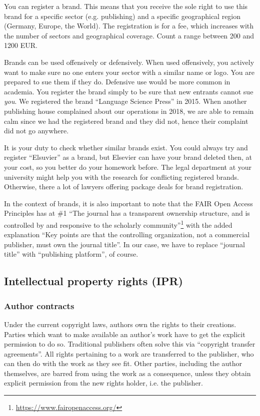 \documentclass[nonflat,smallfont
]{langsci/langscibook}
\newcommand{\footurl}[1]{\footnote{\url{#1}}}
\begin{document}
You can register a brand. This means that you receive the sole right to use this brand for a specific sector (e.g. publishing) and a specific geographical region (Germany, Europe, the World). The registration is for a fee, which increases with the number of sectors and geographical coverage. Count a range between 200 and 1200 EUR. 

Brands can be used offensively or defensively. When used offensively, you actively want to make sure no one enters your sector with a similar name or logo. You are prepared to sue them if they do. Defensive use would be more common in academia. You register the brand simply to be sure that new entrants cannot sue \textit{you}. We registered the brand ``Language Science Press'' in 2015. When another publishing house complained about our operations in 2018, we are able to remain calm since we had the registered brand and they did not, hence their complaint did not go anywhere.

It is your duty to check whether similar brands exist. You could always try and register ``Elsuvier'' as a brand, but Elsevier can have your brand deleted then, at your cost, so you better do your homework before. The legal department at your university might help you with the research for conflicting registered brands. Otherwise, there a lot of lawyers offering package deals for brand registration. 

In the context of brands, it is also important to note that the FAIR Open Access Principles has at \#1 ``The journal has a transparent ownership structure, and is controlled by and responsive to the scholarly community''\footurl{https://www.fairopenaccess.org/} with the added explanation 
``Key points are that the controlling organization, not a commercial publisher, must own the journal title''. In our case, 
we have to replace ``journal title'' with ``publishing platform'', of course. 
 
\subsection{Intellectual property rights (IPR)}
\subsubsection{Author contracts}\label{sec:authorcontract}
Under the current copyright laws, authors own the rights to their creations. Parties which want to make available an author's work have to get the explicit permission to do so. Traditional publishers often solve this via ``copyright transfer agreements''. All rights pertaining to a work are transferred to the publisher, who can then do with the work as they see fit. Other parties, including the author themselves, are barred from using the work as a consequence, unless they obtain explicit permission from the new rights holder, i.e. the publisher. 
\end{document}

